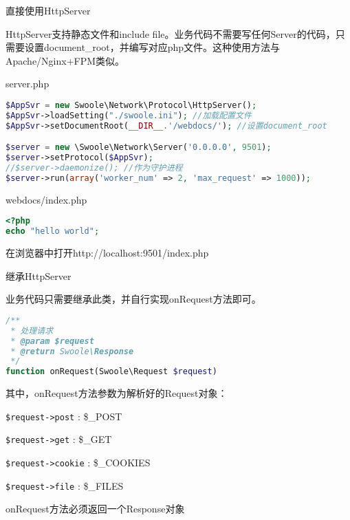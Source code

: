 \begin{compactitem}
\item 直接使用HttpServer


HttpServer支持静态文件和include file。业务代码不需要写任何Server的代码，只需要设置document\_root，并编写对应php文件。这种使用方法与Apache/Nginx+FPM类似。


\begin{example}
server.php
\begin{lstlisting}[language=PHP]
$AppSvr = new Swoole\Network\Protocol\HttpServer();
$AppSvr->loadSetting("./swoole.ini"); //加载配置文件
$AppSvr->setDocumentRoot(__DIR__.'/webdocs/'); //设置document_root

$server = new \Swoole\Network\Server('0.0.0.0', 9501);
$server->setProtocol($AppSvr);
//$server->daemonize(); //作为守护进程
$server->run(array('worker_num' => 2, 'max_request' => 1000));
\end{lstlisting}
\end{example}


\begin{example}
webdocs/index.php
\begin{lstlisting}[language=PHP]
<?php
echo "hello world";
\end{lstlisting}
\end{example}

在浏览器中打开http://localhost:9501/index.php

\item 继承HttpServer

业务代码只需要继承此类，并自行实现onRequest方法即可。

\begin{lstlisting}[language=PHP]
/**
 * 处理请求
 * @param $request
 * @return Swoole\Response
 */
function onRequest(Swoole\Request $request)
\end{lstlisting}

其中，onRequest方法参数为解析好的Request对象：

\begin{compactenum}
\item \texttt{\$request->post} : \$\_POST
\item \texttt{\$request->get} : \$\_GET
\item \texttt{\$request->cookie} : \$\_COOKIES
\item \texttt{\$request->file} : \$\_FILES
\end{compactenum}

onRequest方法必须返回一个Response对象


\end{compactitem}
